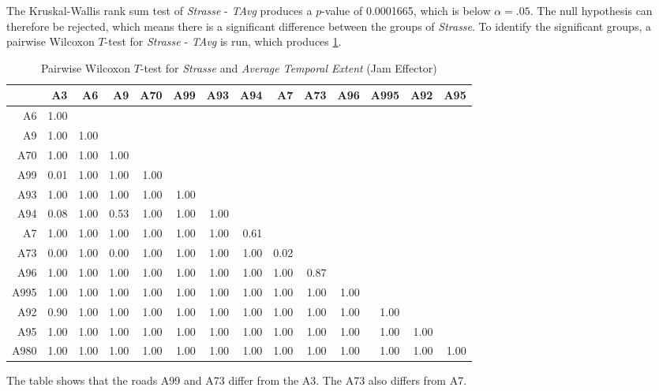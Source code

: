 The Kruskal-Wallis rank sum test of \textit{Strasse} - \textit{TAvg} produces a $p$-value of 0.0001665, which is below $\alpha=.05$. The null hypothesis can therefore be rejected, which means there is a significant difference between the groups of \textit{Strasse}. To identify the significant groups, a pairwise Wilcoxon $T$-test for \textit{Strasse} - \textit{TAvg} is run, which produces \cref{tbl:wilcoxon_baysis_effector_Strasse_TAvg}. 
\begin{table}[ht]
	\tiny
	\centering
	\begin{tabular}{rrrrrrrrrrrrrr}
		\toprule
			 & A3 & A6 & A9 & A70 & A99 & A93 & A94 & A7 & A73 & A96 & A995 & A92 & A95 \\ 
		\midrule
		A6   & 1.00 &  &  &  &  &  &  &  &  &  &  &  &  \\ 
		A9   & 1.00 & 1.00 &  &  &  &  &  &  &  &  &  &  &  \\ 
		A70  & 1.00 & 1.00 & 1.00 &  &  &  &  &  &  &  &  &  &  \\ 
		A99  & 0.01 & 1.00 & 1.00 & 1.00 &  &  &  &  &  &  &  &  &  \\ 
		A93  & 1.00 & 1.00 & 1.00 & 1.00 & 1.00 &  &  &  &  &  &  &  &  \\ 
		A94  & 0.08 & 1.00 & 0.53 & 1.00 & 1.00 & 1.00 &  &  &  &  &  &  &  \\ 
		A7   & 1.00 & 1.00 & 1.00 & 1.00 & 1.00 & 1.00 & 0.61 &  &  &  &  &  &  \\ 
		A73  & 0.00 & 1.00 & 0.00 & 1.00 & 1.00 & 1.00 & 1.00 & 0.02 &  &  &  &  &  \\ 
		A96  & 1.00 & 1.00 & 1.00 & 1.00 & 1.00 & 1.00 & 1.00 & 1.00 & 0.87 &  &  &  &  \\ 
		A995 & 1.00 & 1.00 & 1.00 & 1.00 & 1.00 & 1.00 & 1.00 & 1.00 & 1.00 & 1.00 &  &  &  \\ 
		A92  & 0.90 & 1.00 & 1.00 & 1.00 & 1.00 & 1.00 & 1.00 & 1.00 & 1.00 & 1.00 & 1.00 &  &  \\ 
		A95  & 1.00 & 1.00 & 1.00 & 1.00 & 1.00 & 1.00 & 1.00 & 1.00 & 1.00 & 1.00 & 1.00 & 1.00 &  \\ 
		A980 & 1.00 & 1.00 & 1.00 & 1.00 & 1.00 & 1.00 & 1.00 & 1.00 & 1.00 & 1.00 & 1.00 & 1.00 & 1.00 \\ 
		\bottomrule
	  \end{tabular}
    \caption{Pairwise Wilcoxon $T$-test for \textit{Strasse} and \textit{Average Temporal Extent} (Jam Effector)}
    \label{tbl:wilcoxon_baysis_effector_Strasse_TAvg}
\end{table}
The table shows that the roads A99 and A73 differ from the A3. The A73 also differs from A7.

